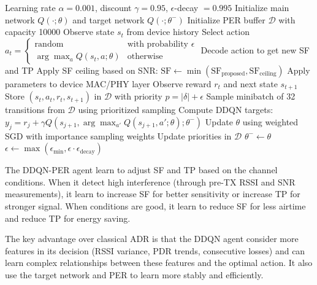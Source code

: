 \documentclass[12pt,a4paper]{article}
\begin{document}
\begin{algorithm}[H]
\caption{DDQN-PER ADR Agent}
\label{alg:ddqn_per_adr}
\begin{algorithmic}[1]
\Require Learning rate $\alpha = 0.001$, discount $\gamma = 0.95$, $\epsilon$-decay $= 0.995$
\State Initialize main network $Q(\cdot; \theta)$ and target network $Q(\cdot; \theta^-)$
\State Initialize PER buffer $\mathcal{D}$ with capacity 10000
    \State Observe state $s_t$ from device history
    \State Select action $a_t = \begin{cases} \text{random} & \text{with probability } \epsilon \\ \arg\max_a Q(s_t, a; \theta) & \text{otherwise} \end{cases}$
    \State Decode action to get new SF and TP
    \State Apply SF ceiling based on SNR: $\text{SF} \gets \min(\text{SF}_{\text{proposed}}, \text{SF}_{\text{ceiling}})$
    \State Apply parameters to device MAC/PHY layer
    \State Observe reward $r_t$ and next state $s_{t+1}$
    \State Store $(s_t, a_t, r_t, s_{t+1})$ in $\mathcal{D}$ with priority $p = |\delta| + \epsilon$
    \State Sample minibatch of 32 transitions from $\mathcal{D}$ using prioritized sampling
    \State Compute DDQN targets: $y_j = r_j + \gamma Q(s_{j+1}, \arg\max_{a'} Q(s_{j+1}, a'; \theta); \theta^-)$
    \State Update $\theta$ using weighted SGD with importance sampling weights
    \State Update priorities in $\mathcal{D}$
        \State $\theta^- \gets \theta$ 
    \EndIf
    \State $\epsilon \gets \max(\epsilon_{\min}, \epsilon \cdot \epsilon_{\text{decay}})$
\EndFor
\end{algorithmic}
\end{algorithm}


The DDQN-PER agent learn to adjust SF and TP based on the channel conditions. When it detect high interference (through pre-TX RSSI and SNR measurements), it learn to increase SF for better sensitivity or increase TP for stronger signal. When conditions are good, it learn to reduce SF for less airtime and reduce TP for energy saving.

The key advantage over classical ADR is that the DDQN agent consider more features in its decision (RSSI variance, PDR trends, consecutive losses) and can learn complex relationships between these features and the optimal action. It also use the target network and PER to learn more stably and efficiently.
\end{document}
